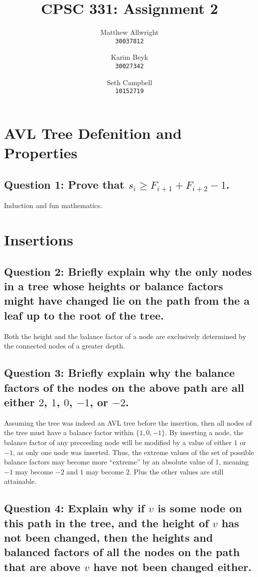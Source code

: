 \documentclass[a4paper, 12pt, titlepage]{article}
\title{CPSC 331: Assignment 2}
\author{
  Matthew Allwright\\
  \texttt{30037812}
  \and
  Karim Beyk\\
  \texttt{30027342}
  \and
  Seth Campbell\\
  \texttt{10152719}
}
\begin{document}
\maketitle

\section*{AVL Tree Defenition and Properties}

\subsection*{Question 1: Prove that $s_i \geq F_{i+1}+F_{i+2}-1$.}

Induction and fun mathematics.

\section*{Insertions}

\subsection*{Question 2: Briefly explain why the only nodes in a tree whose heights or balance factors might
have changed lie on the path from the a leaf up to the root of the tree.} 

Both the height and the balance factor of a node are exclusively determined by the connected nodes of a greater depth.

\subsection*{Question 3: Briefly explain why the balance factors of the nodes on the above path are all either $2$, $1$, $0$, $-1$, or $-2$.} 

Assuming the tree was indeed an AVL tree before the insertion, 
then all nodes of the tree must have a balance factor within $\{1, 0, -1\}$. 
By inserting a node, 
the balance factor of any preceeding node will be modified by a value of either $1$ or $-1$, 
as only one node was inserted. 
Thus, 
the extreme values of the set of possible balance factors may become more ``extreme'' by an absolute value of 1, 
meaning $-1$ may become $-2$ and $1$ may become $2$.
Plus the other values are still attainable.

\subsection*{Question 4: Explain why if $v$ is some node on this path in the tree, and the height of $v$ has not been changed, then the heights and balanced factors of all the nodes on the path that are above $v$ have not been changed either.} 
\end{document}
